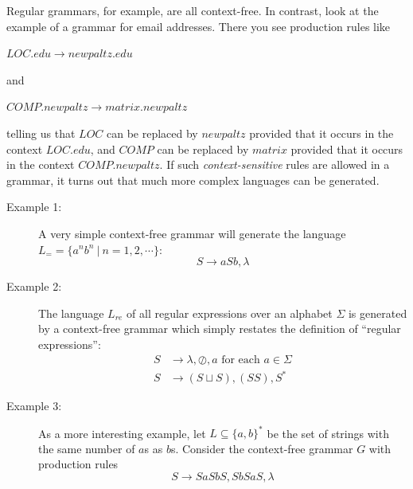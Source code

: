 \documentclass{article}
\begin{document}
Regular grammars, for example, are all context-free. In contrast, look at the example of a grammar for email addresses. There you see production rules like
\begin{center}
$LOC.edu \to newpaltz.edu$
\end{center}
and
\begin{center}
$COMP.newpaltz \to matrix.newpaltz$
\end{center}
telling us that $LOC$ can be replaced by $newpaltz$ provided that it occurs in the context $LOC.edu$, and $COMP$ can be replaced by $matrix$ provided that it occurs in the context $COMP.newpaltz$. If such \emph{context-sensitive} rules are allowed in a grammar, it turns out that much more complex languages can be generated.

\begin{description}

\item[Example 1:] A very simple context-free grammar will generate the language $L_= = \{ a^n b^n\ |\ n=1,2,\cdots \}$:
  \begin{equation*}
  S \to aSb,\lambda
  \end{equation*}

\item[Example 2:] The language $L_{re}$ of all regular expressions over an alphabet $\Sigma$ is generated by a context-free grammar which simply restates the definition of ``regular expressions'':
  \begin{align*}
    S & \to \lambda,\oslash,a \text{ for each } a \in \Sigma \\
    S & \to (S \sqcup S),(SS),S^*
  \end{align*}

\item[Example 3:] As a more interesting example, let $L \subseteq \{a,b\}^*$ be the set of strings with the same number of $a$s as $b$s. Consider the context-free grammar $G$ with production rules
  \begin{equation*}
  S \to SaSbS,SbSaS,\lambda
  \end{equation*}


\end{description}
\end{document}

